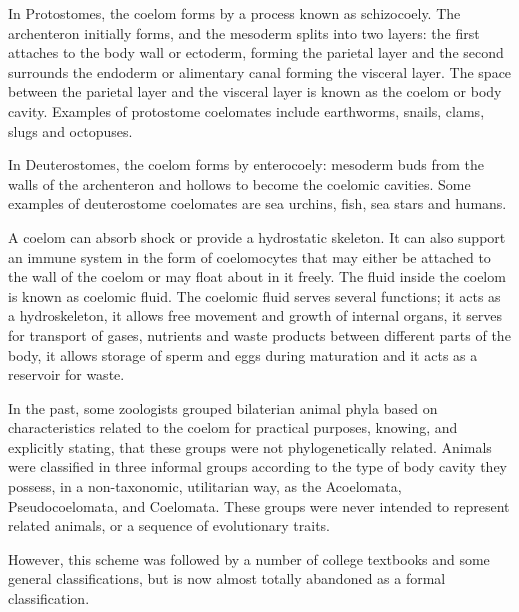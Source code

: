\documentclass[]{book}
\theoremstyle{definition}
\theoremstyle{definition}
\theoremstyle{definition}
\theoremstyle{remark}
\begin{document}
In Protostomes, the coelom forms by a process known as schizocoely. The
archenteron initially forms, and the mesoderm splits into two layers:
the first attaches to the body wall or ectoderm, forming the parietal
layer and the second surrounds the endoderm or alimentary canal forming
the visceral layer. The space between the parietal layer and the
visceral layer is known as the coelom or body cavity. Examples of
protostome coelomates include earthworms, snails, clams, slugs and
octopuses.

In Deuterostomes, the coelom forms by enterocoely: mesoderm buds from
the walls of the archenteron and hollows to become the coelomic
cavities. Some examples of deuterostome coelomates are sea urchins,
fish, sea stars and humans.

A coelom can absorb shock or provide a hydrostatic skeleton. It can also
support an immune system in the form of coelomocytes that may either be
attached to the wall of the coelom or may float about in it freely. The
fluid inside the coelom is known as coelomic fluid. The coelomic fluid
serves several functions; it acts as a hydroskeleton, it allows free
movement and growth of internal organs, it serves for transport of
gases, nutrients and waste products between different parts of the body,
it allows storage of sperm and eggs during maturation and it acts as a
reservoir for waste.

In the past, some zoologists grouped bilaterian animal phyla based on
characteristics related to the coelom for practical purposes, knowing,
and explicitly stating, that these groups were not phylogenetically
related. Animals were classified in three informal groups according to
the type of body cavity they possess, in a non-taxonomic, utilitarian
way, as the Acoelomata, Pseudocoelomata, and Coelomata. These groups
were never intended to represent related animals, or a sequence of
evolutionary traits.

However, this scheme was followed by a number of college textbooks and
some general classifications, but is now almost totally abandoned as a
formal classification.
\end{document}

